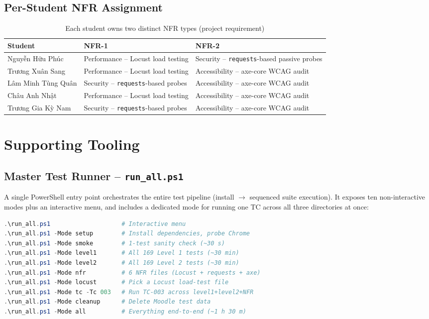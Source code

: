 \documentclass[twoside,final]{hcmut-report}
\begin{document}
\subsection{Per-Student NFR Assignment}
\begin{table}[H]
\centering
\renewcommand{\arraystretch}{1.3}
\begin{tabularx}{\textwidth}{|p{3.6cm}|X|X|}
\hline
\textbf{Student} & \textbf{NFR-1} & \textbf{NFR-2} \\ \hline
Nguyễn Hữu Phúc      & Performance -- Locust load testing       & Security -- \texttt{requests}-based passive probes \\ \hline
Trương Xuân Sang     & Performance -- Locust load testing       & Accessibility -- axe-core WCAG audit \\ \hline
Lâm Minh Tùng Quân   & Security -- \texttt{requests}-based probes & Accessibility -- axe-core WCAG audit \\ \hline
Châu Anh Nhật        & Performance -- Locust load testing       & Accessibility -- axe-core WCAG audit \\ \hline
Trương Gia Kỳ Nam    & Security -- \texttt{requests}-based probes & Accessibility -- axe-core WCAG audit \\ \hline
\end{tabularx}
\caption{Each student owns two distinct NFR types (project requirement)}
\label{tab:per-student-nfr}
\end{table}

\section{Supporting Tooling}

\subsection{Master Test Runner -- \texttt{run\_all.ps1}}
A single PowerShell entry point orchestrates the entire test pipeline (install $\to$ sequenced suite execution). It exposes ten non-interactive modes plus an interactive menu, and includes a dedicated mode for running one TC across all three directories at once:

\begin{lstlisting}[language=PowerShell, basicstyle=\ttfamily\footnotesize]
.\run_all.ps1                    # Interactive menu
.\run_all.ps1 -Mode setup        # Install dependencies, probe Chrome
.\run_all.ps1 -Mode smoke        # 1-test sanity check (~30 s)
.\run_all.ps1 -Mode level1       # All 169 Level 1 tests (~30 min)
.\run_all.ps1 -Mode level2       # All 169 Level 2 tests (~30 min)
.\run_all.ps1 -Mode nfr          # 6 NFR files (Locust + requests + axe)
.\run_all.ps1 -Mode locust       # Pick a Locust load-test file
.\run_all.ps1 -Mode tc -Tc 003   # Run TC-003 across level1+level2+NFR
.\run_all.ps1 -Mode cleanup      # Delete Moodle test data
.\run_all.ps1 -Mode all          # Everything end-to-end (~1 h 30 m)
\end{lstlisting}
\end{document}
